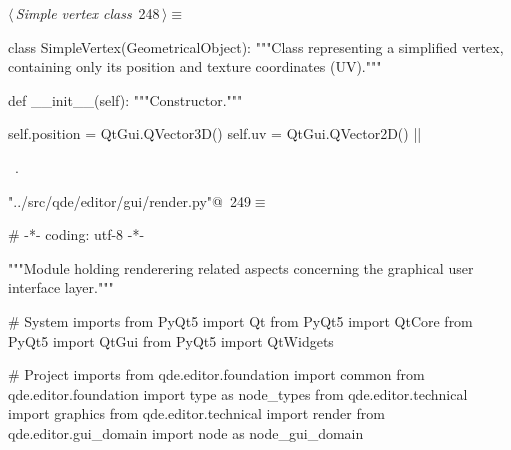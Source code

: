 \documentclass[%
    a4paper,    %
    justified,  %
    nobib,      %
    openany     %
]{tufte-book}
\makeatletter
\renewcommand{\label}[1]{\@tufte@label{##1}}%
\makeatother
\begin{document}
\begin{fullwidth}
\begin{flushleft}
\begin{minipage}{\linewidth}
\begin{list}{}{\setlength{\itemsep}{-\parsep}\setlength{\itemindent}{-\leftmargin}}
\item{}
\end{list}
\end{minipage}\vspace{4ex}
\end{flushleft}
\begin{flushleft} \small
\begin{minipage}{\linewidth}\label{scrap272}\raggedright\small
{} $\langle\,${\itshape Simple vertex class}\nobreak\ {\footnotesize {248}}$\,\rangle\equiv$
\vspace{-1ex}
\begin{pythoncode}
class SimpleVertex(GeometricalObject):
    """Class representing a simplified vertex, containing only its position and
    texture coordinates (UV)."""

    def __init__(self):
        """Constructor."""

        self.position = QtGui.QVector3D()
        self.uv       = QtGui.QVector2D()
|\NWsep|
\end{pythoncode}
\vspace{1.5ex}
\footnotesize
\begin{list}{}{\setlength{\itemsep}{-\parsep}\setlength{\itemindent}{-\leftmargin}}
\item \NWtxtMacroRefIn\ .

\item{}
\end{list}
\end{minipage}\vspace{4ex}
\end{flushleft}

\begin{flushleft} \small
\begin{minipage}{\linewidth}\label{scrap273}\raggedright\small
{} \verb@"../src/qde/editor/gui/render.py"@\nobreak\ {\footnotesize {249}}$\equiv$
\vspace{-1ex}
\begin{pythoncode}
# -*- coding: utf-8 -*-

"""Module holding renderering related aspects concerning the graphical user
interface layer."""

# System imports
from PyQt5 import Qt
from PyQt5 import QtCore
from PyQt5 import QtGui
from PyQt5 import QtWidgets


# Project imports
from qde.editor.foundation import common
from qde.editor.foundation import type as node_types
from qde.editor.technical  import graphics
from qde.editor.technical  import render
from qde.editor.gui_domain import node as node_gui_domain



\end{pythoncode}
\end{minipage}
\end{flushleft}
\end{fullwidth}
\end{document}
